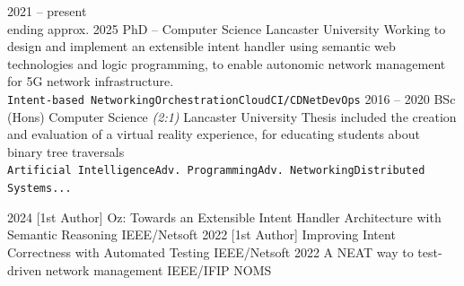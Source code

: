 \documentclass[9pt]{developercv} %
\begin{document}
\begin{entrylist}
	\entry
	{2021 -- present\\\footnotesize{ending approx. 2025}}
	{PhD -- Computer Science}
	{Lancaster University}
	{Working to design and implement an extensible intent handler using semantic
	web technologies and logic programming, to enable autonomic network
	management for 5G network infrastructure.}
	\\\texttt{Intent-based
	Networking}\slashsep\texttt{Orchestration}\slashsep\texttt{Cloud}\slashsep\texttt{CI/CD}\slashsep\texttt{NetDevOps}
	\entry
	{2016 -- 2020}
	{BSc (Hons) Computer Science \textit{(2:1)}}
	{Lancaster University}
	{Thesis included the creation and evaluation of a virtual reality
	experience, for educating students about binary tree traversals
	\\\texttt{Artificial Intelligence}\slashsep\texttt{Adv.
			Programming}\slashsep\texttt{Adv. Networking}\slashsep\texttt{Distributed Systems}\slashsep\texttt{...}}
\end{entrylist}


\vspace{-1em}

\begin{entrylist}
	\pubentry
	{2024}
	{[1st Author]}
	{Oz: Towards an Extensible Intent Handler Architecture with Semantic
	Reasoning}
	{IEEE/Netsoft}
	\pubentry
	{2022}
	{[1st Author]}
	{Improving Intent Correctness with Automated Testing}
	{IEEE/Netsoft}
	\pubentry
	{2022}
	{}
	{A NEAT way to test-driven network management}
	{IEEE/IFIP NOMS}
\end{entrylist}

\end{document}
